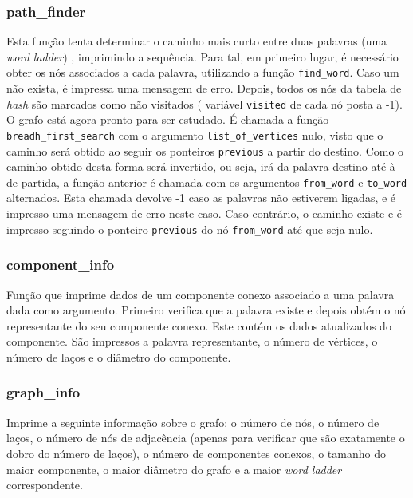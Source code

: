 \documentclass[portuguese,11pt,a4paper,titlepage]{article}
\newcommand{\foreign}[1]{\textit{#1}}
\begin{document}
\subsubsection{path\_finder}
Esta função tenta determinar o caminho mais curto entre duas palavras (uma \foreign{word ladder})
, imprimindo a sequência. Para tal, em primeiro lugar, é necessário obter os nós associados a
cada palavra, utilizando a função \verb|find_word|. Caso um não exista, é impressa uma mensagem
de erro. Depois, todos os nós da tabela de \foreign{hash} são marcados como não visitados (
variável \verb|visited| de cada nó posta a -1). O grafo está agora pronto para ser estudado. É
chamada a função \verb|breadh_first_search| com o argumento \verb|list_of_vertices| nulo, visto
que o caminho será obtido ao seguir os ponteiros \verb|previous| a partir do destino. Como o
caminho obtido desta forma será invertido, ou seja, irá da palavra destino até à de partida, 
a função anterior é chamada com os argumentos \verb|from_word| e \verb|to_word| alternados. Esta
chamada devolve -1 caso as palavras não estiverem ligadas, e é impresso uma mensagem de erro
neste caso. Caso contrário, o caminho existe e é impresso seguindo o ponteiro \verb|previous|
do nó \verb|from_word| até que seja nulo.

\subsubsection{component\_info}
Função que imprime dados de um componente conexo associado a uma palavra dada como argumento.
Primeiro verifica que a palavra existe e depois obtém o nó representante do seu componente
conexo. Este contém os dados atualizados do componente. São impressos a palavra representante,
o número de vértices, o número de laços e o diâmetro do componente.

\subsubsection{graph\_info}
Imprime a seguinte informação sobre o grafo: o número de nós, o número de laços, o número de
nós de adjacência (apenas para verificar que são exatamente o dobro do número de laços), o
número de componentes conexos, o tamanho do maior componente, o maior diâmetro do grafo e a 
maior \foreign{word ladder} correspondente.
\end{document}
